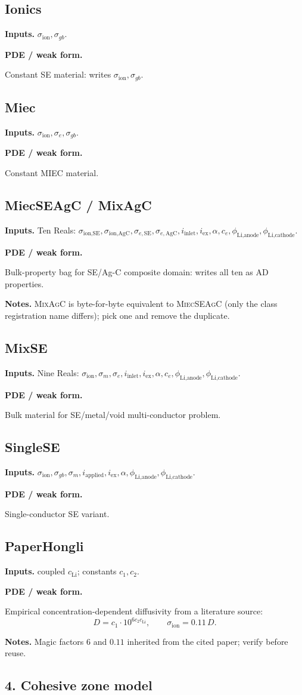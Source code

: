 \documentclass[11pt]{article}
\newenvironment{ecmEntry}[1]{%
  \subsection{#1}%
}{}
\newcommand{\inputsRow}[1]{\par\noindent\textbf{Inputs.} #1\par}
\newcommand{\pdeRow}[1]{\par\noindent\textbf{PDE / weak form.}\par #1\par}
\newcommand{\notesRow}[1]{\par\noindent\textbf{Notes.} #1\par}
\begin{document}
\begin{ecmEntry}{Ionics}
\inputsRow{$\sigma_{\text{ion}},\sigma_{gb}$.}
\pdeRow{Constant SE material: writes $\sigma_{\text{ion}},\sigma_{gb}$.}
\end{ecmEntry}

\begin{ecmEntry}{Miec}
\inputsRow{$\sigma_{\text{ion}},\sigma_e,\sigma_{gb}$.}
\pdeRow{Constant MIEC material.}
\end{ecmEntry}

\begin{ecmEntry}{MiecSEAgC / MixAgC}
\inputsRow{Ten Reals: $\sigma_{\text{ion,SE}},\sigma_{\text{ion,AgC}},\sigma_{e,\text{SE}},\sigma_{e,\text{AgC}},
i_{\text{inlet}},i_{\text{ex}},\alpha,c_e,\phi_{\text{Li,anode}},\phi_{\text{Li,cathode}}$.}
\pdeRow{Bulk-property bag for SE/Ag-C composite domain: writes all ten as AD properties.}
\notesRow{\textsc{MixAgC} is byte-for-byte equivalent to \textsc{MiecSEAgC} (only the
class registration name differs); pick one and remove the duplicate.}
\end{ecmEntry}

\begin{ecmEntry}{MixSE}
\inputsRow{Nine Reals: $\sigma_{\text{ion}},\sigma_m,\sigma_e,i_{\text{inlet}},i_{\text{ex}},\alpha,c_e,
\phi_{\text{Li,anode}},\phi_{\text{Li,cathode}}$.}
\pdeRow{Bulk material for SE/metal/void multi-conductor problem.}
\end{ecmEntry}

\begin{ecmEntry}{SingleSE}
\inputsRow{$\sigma_{\text{ion}},\sigma_{gb},\sigma_m,i_{\text{applied}},i_{\text{ex}},\alpha,
\phi_{\text{Li,anode}},\phi_{\text{Li,cathode}}$.}
\pdeRow{Single-conductor SE variant.}
\end{ecmEntry}

\begin{ecmEntry}{PaperHongli}
\inputsRow{coupled $c_{\text{Li}}$; constants $c_1,c_2$.}
\pdeRow{Empirical concentration-dependent diffusivity from a literature source:
\[
  D = c_1\cdot 10^{6 c_2 c_{\text{Li}}},\qquad \sigma_{\text{ion}} = 0.11\,D.
\]}
\notesRow{Magic factors $6$ and $0.11$ inherited from the cited paper; verify before reuse.}
\end{ecmEntry}

\subsection*{4. Cohesive zone model}
\end{document}
